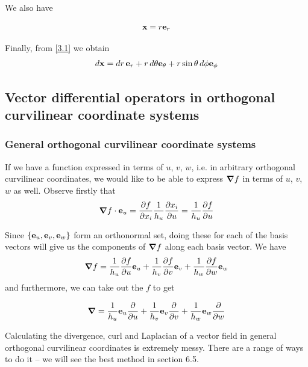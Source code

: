 \documentclass{../template/note}
\begin{document}
    We also have
    
    \begin{proposition}
        \label{3.5} \[
            \V x = r \V e_r
        \]
    \end{proposition}
    Finally, from \cref{3.1} we obtain
    \begin{align*}
        d\V x = dr\, \V e_r + r \D \theta \V e_\theta + r \sin \theta \D \phi \V e_\phi
    \end{align*}
    
    \subsection{Vector differential operators in orthogonal curvilinear coordinate systems}

    \subsubsection{General orthogonal curvilinear coordinate systems}

    If we have a function expressed in terms of \(u\), \(v\), \(w\), i.e. in arbitrary orthogonal curvilinear coordinates, we would like to be able to express \(\grad f\) in terms of \(u\), \(v\), \(w\) as well. Observe firstly that
    \begin{align*}
        \grad f \cdot \V e_u = \pd{f}{x_i} \frac 1 {h_u}\pd{x_i}{u} = \frac 1 {h_u} \pd{f}{u}
    \end{align*}
    

    Since \(\{\V e_u, \V e_v, \V e_w\}\) form an orthonormal set, doing these for each of the basis vectors will give us the components of \(\grad f\) along each basis vector. We have
    \begin{align*}
        \grad f = \frac 1 {h_u} \pd f u \V e_u + \frac 1 {h_v} \pd f v \V e_v + \frac 1 {h_w} \pd f w \V e_w
    \end{align*}
    and furthermore, we can take out the \(f\) to get
    \begin{proposition}
        \label{3.6} \[
            \grad = \frac 1 {h_u} \V e_u \pd {} u + \frac 1 {h_v} \V e_v \pd {} v + \frac 1 {h_w} \V e_w \pd {} w
        \]
    \end{proposition}
    Calculating the divergence, curl and Laplacian of a vector field in general orthogonal curvilinear coordinates is extremely messy. There are a range of ways to do it -- we will see the best method in section 6.5.
\end{document}
